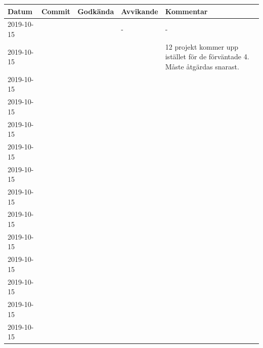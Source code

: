 \documentclass{TDP003mall}
\begin{document}
\begin{tabular}{|l|l|l|l|l|}
  \hline
  Datum & Commit & Godkända & Avvikande & Kommentar \\ [0.5ex]
  \hline
  2019-10-15 &  &  & - & - \\
  \hline
  \hline
  2019-10-15 &  &  &  & 12 projekt kommer upp istället för de förväntade 4. Måste åtgärdas snarast.\\
  \hline
  \hline
  2019-10-15 &  &  &  & \\
  \hline
  \hline
  2019-10-15 &  &  &  & \\
  \hline
  \hline
  2019-10-15 &  &  &  & \\
  \hline
  \hline
  2019-10-15 &  &  &  & \\
  \hline
  \hline
  2019-10-15 &  &  &  & \\
  \hline
  \hline
  2019-10-15 &  &  &  & \\
  \hline
  \hline
  2019-10-15 &  &  &  & \\
  \hline
  \hline
  2019-10-15 &  &  &  & \\
  \hline
  \hline
  2019-10-15 &  &  &  & \\
  \hline
  \hline
  2019-10-15 &  &  &  & \\
  \hline
  \hline
  2019-10-15 &  &  &  & \\
  \hline
  \hline
  2019-10-15 &  &  &  & \\
  \hline
\end{tabular}





\end{document}
